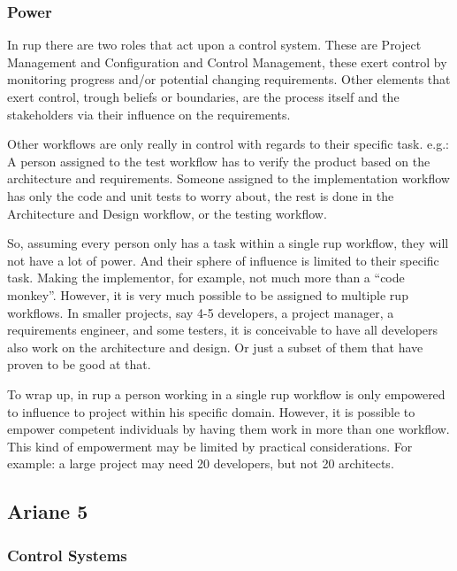 \subsubsection{Power}
In \ac{rup} there are two roles that act upon a control system. These are Project Management and Configuration and Control Management, these exert control by monitoring progress and/or potential changing requirements. Other elements that exert control, trough beliefs or boundaries, are the process itself and the stakeholders via their influence on the requirements.

Other workflows are only really in control with regards to their specific task.
e.g.: A person assigned to the test workflow has to verify the product based on the architecture and requirements. Someone assigned to the implementation workflow has only the code and unit tests to worry about, the rest is done in the Architecture and Design workflow, or the testing workflow.

So, assuming every person only has a task within a single \ac{rup} workflow, they will not have a lot of power.
And their sphere of influence is limited to their specific task.
Making the implementor, for example, not much more than a ``code monkey''.
However, it is very much possible to be assigned to multiple \ac{rup} workflows.
In smaller projects, say 4-5 developers, a project manager, a requirements engineer, and some testers, it is conceivable to have all developers also work on the architecture and design. Or just a subset of them that have proven to be good at that.

To wrap up, in \ac{rup} a person working in a single \ac{rup} workflow is only empowered to influence to project within his specific domain.
However, it is possible to empower competent individuals by having them work in more than one workflow.
This kind of empowerment may be limited by practical considerations. For example: a large project may need 20 developers, but not 20 architects.


\subsection{Ariane 5}
\subsubsection{Control Systems}

